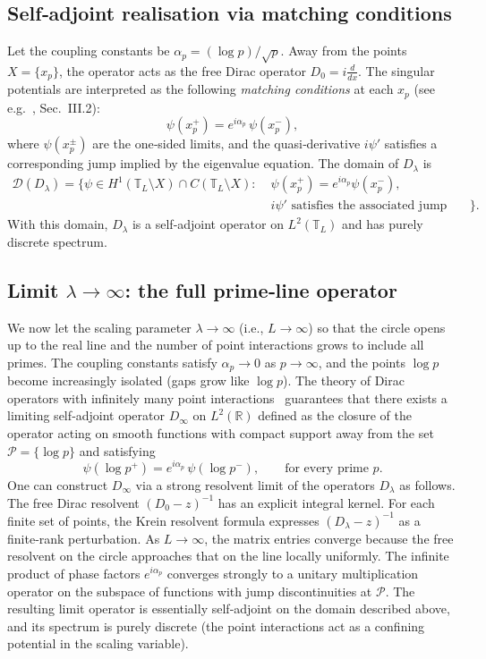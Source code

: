 \documentclass[12pt,a4paper]{article}
\newcommand{\R}{\mathbb{R}}
\newcommand{\calD}{\mathcal{D}}
\begin{document}
\subsection{Self‑adjoint realisation via matching conditions}

Let the coupling constants be \(\alpha_p = (\log p)/\sqrt{p}\).  Away from the points \(X = \{x_p\}\), the operator acts as the free Dirac operator \(D_0 = i\frac{d}{dx}\).  The singular potentials are interpreted as the following \emph{matching conditions} at each \(x_p\) (see e.g.~\cite{Albeverio1988}, Sec.~III.2):
\[
\psi(x_p^+) = e^{i\alpha_p}\,\psi(x_p^-),
\tag{2}
\]
where \(\psi(x_p^\pm)\) are the one‑sided limits, and the quasi‑derivative \(i\psi'\) satisfies a corresponding jump implied by the eigenvalue equation.  The domain of \(D_\lambda\) is
\[
\begin{aligned}
\calD(D_\lambda) = \bigl\{ \psi \in H^1(\mathbb{T}_L\setminus X) \cap C(\mathbb{T}_L\setminus X) :\;
&\psi(x_p^+) = e^{i\alpha_p}\psi(x_p^-), \\
& i\psi' \text{ satisfies the associated jump condition} \bigr\}.
\end{aligned}
\]
With this domain, \(D_\lambda\) is a self‑adjoint operator on \(L^2(\mathbb{T}_L)\) and has purely discrete spectrum.

\subsection{Limit \(\lambda\to\infty\): the full prime‑line operator}

We now let the scaling parameter \(\lambda\to\infty\) (i.e., \(L\to\infty\)) so that the circle opens up to the real line and the number of point interactions grows to include all primes.  The coupling constants satisfy \(\alpha_p \to 0\) as \(p\to\infty\), and the points \(\log p\) become increasingly isolated (gaps grow like \(\log p\)).  The theory of Dirac operators with infinitely many point interactions~\cite{Albeverio1988} guarantees that there exists a limiting self‑adjoint operator \(D_\infty\) on \(L^2(\R)\) defined as the closure of the operator acting on smooth functions with compact support away from the set \(\mathcal{P} = \{\log p\}\) and satisfying
\[
\psi(\log p^+) = e^{i\alpha_p}\,\psi(\log p^-), \qquad \text{for every prime } p .
\tag{3}
\]
One can construct \(D_\infty\) via a strong resolvent limit of the operators \(D_\lambda\) as follows.  The free Dirac resolvent \((D_0 - z)^{-1}\) has an explicit integral kernel.  For each finite set of points, the Krein resolvent formula expresses \((D_\lambda - z)^{-1}\) as a finite‑rank perturbation.  As \(L\to\infty\), the matrix entries converge because the free resolvent on the circle approaches that on the line locally uniformly.  The infinite product of phase factors \(e^{i\alpha_p}\) converges strongly to a unitary multiplication operator on the subspace of functions with jump discontinuities at \(\mathcal{P}\).  The resulting limit operator is essentially self‑adjoint on the domain described above, and its spectrum is purely discrete (the point interactions act as a confining potential in the scaling variable).
\end{document}
